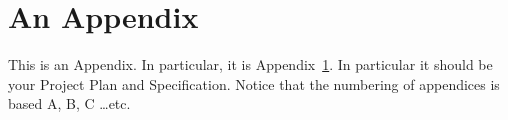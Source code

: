 \chapter{An Appendix}\label{app:an}
This is an Appendix. In particular, it is Appendix~\ref{app:an}. In particular
it should be your Project Plan and Specification. Notice that the numbering of
appendices is based A, B, C \ldots etc.
